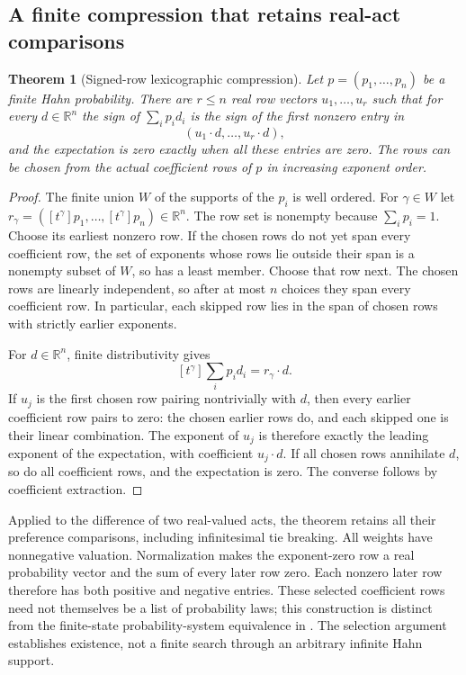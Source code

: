 \documentclass[11pt,a4paper]{article}
\numberwithin{equation}{section}
\newtheorem{theorem}{Theorem}[section]
\theoremstyle{definition}
\theoremstyle{remark}
\newcommand{\R}{\mathbb R}
\begin{document}
\subsection{A finite compression that retains real-act comparisons}

\begin{theorem}[Signed-row lexicographic compression]\label{fsp:thm:compression}
Let $p=(p_1,\ldots,p_n)$ be a finite Hahn probability. There are
$r\le n$ real row vectors $u_1,\ldots,u_r$ such that for every
$d\in\R^n$ the sign of $\sum_i p_i d_i$ is the sign of the first
nonzero entry in
\begin{equation}
 (u_1\cdot d,\ldots,u_r\cdot d),
\end{equation}
and the expectation is zero exactly when all these entries are zero.
The rows can be chosen from the actual coefficient rows of $p$ in
increasing exponent order.
\end{theorem}
\begin{proof}
The finite union $W$ of the supports of the $p_i$ is well ordered.
For $\gamma\in W$ let
$r_\gamma=([t^\gamma]p_1,\ldots,[t^\gamma]p_n)\in\R^n$.
The row set is nonempty because $\sum_i p_i=1$. Choose its earliest
nonzero row. If the chosen rows do not yet span every coefficient row,
the set of exponents whose rows lie outside their span is a nonempty
subset of $W$, so has a least member. Choose that row next.
The chosen rows are linearly independent, so after at most $n$ choices
they span every coefficient row. In particular, each skipped row lies
in the span of chosen rows with strictly earlier exponents.

For $d\in\R^n$, finite distributivity gives
\[
 [t^\gamma]\sum_i p_i d_i=r_\gamma\cdot d.
\]
If $u_j$ is the first chosen row pairing nontrivially with $d$, then
every earlier coefficient row pairs to zero: the chosen earlier rows do,
and each skipped one is their linear combination. The exponent of $u_j$
is therefore exactly the leading exponent of the expectation, with
coefficient $u_j\cdot d$. If all chosen rows annihilate $d$, so do all
coefficient rows, and the expectation is zero. The converse follows by
coefficient extraction.
\end{proof}

Applied to the difference of two real-valued acts, the theorem retains
all their preference comparisons, including infinitesimal tie breaking.
All weights have nonnegative valuation. Normalization makes the
exponent-zero row a real probability vector and the sum of every later
row zero. Each nonzero later row therefore has both positive and negative
entries. These selected coefficient rows need not themselves be a list of
probability laws; this construction is distinct from the finite-state
probability-system equivalence in \cite[Section~4]{halpern}.
The selection argument establishes existence, not a finite search through
an arbitrary infinite Hahn support.
\end{document}
